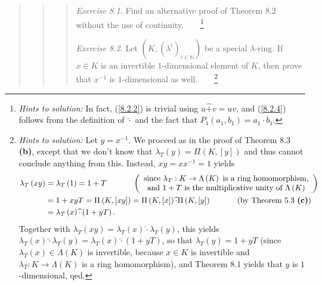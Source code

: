 \documentclass[12pt,final,notitlepage,onecolumn,german]{article}%
\begin{document}
\begin{quote}
\begin{quote}
\begin{quotation}
\textit{Exercise 8.1.} Find an alternative proof of Theorem 8.2 without the
use of continuity.\ \ \ \ \footnote{\textit{Hints to solution:} In fact,
(\ref{8.2.2}) is trivial using $u\widehat{+}v=uv$, and (\ref{8.2.4}) follows
from the definition of $\widehat{\cdot}$ and the fact that $P_{1}\left(
a_{1},b_{1}\right)  =a_{1}\cdot b_{1}$.}

\textit{Exercise 8.2.} Let $\left(  K,\left(  \lambda^{i}\right)
_{i\in\mathbb{N}}\right)  $ be a special $\lambda$-ring. If $x\in K$ is an
invertible $1$-dimensional element of $K$, then prove that $x^{-1}$ is
$1$-dimensional as well.\ \ \ \ \footnote{\textit{Hints to solution:} Let
$y=x^{-1}$. We proceed as in the proof of Theorem 8.3 \textbf{(b)}, except
that we don't know that $\lambda_{T}\left(  y\right)  =\Pi\left(  K,\left[
y\right]  \right)  $ and thus cannot conclude anything from this. Instead,
$xy=xx^{-1}=1$ yields%
\begin{align*}
\lambda_{T}\left(  xy\right)   &  =\lambda_{T}\left(  1\right)
=1+T\ \ \ \ \ \ \ \ \ \ \left(
\begin{array}
[c]{c}%
\text{since }\lambda_{T}:K\rightarrow\Lambda\left(  K\right)  \text{ is a ring
homomorphism,}\\
\text{and }1+T\text{ is the multiplicative unity of }\Lambda\left(  K\right)
\end{array}
\right) \\
&  =1+xyT=\Pi\left(  K,\left[  xy\right]  \right)  =\Pi\left(  K,\left[
x\right]  \right)  \widehat{\cdot}\Pi\left(  K,\left[  y\right]  \right)
\ \ \ \ \ \ \ \ \ \ \left(  \text{by Theorem 5.3 \textbf{(c)}}\right) \\
&  =\lambda_{T}\left(  x\right)  \widehat{\cdot}\left(  1+yT\right)  .
\end{align*}
Together with $\lambda_{T}\left(  xy\right)  =\lambda_{T}\left(  x\right)
\widehat{\cdot}\lambda_{T}\left(  y\right)  $, this yields $\lambda_{T}\left(
x\right)  \widehat{\cdot}\lambda_{T}\left(  y\right)  =\lambda_{T}\left(
x\right)  \widehat{\cdot}\left(  1+yT\right)  $, so that $\lambda_{T}\left(
y\right)  =1+yT$ (since $\lambda_{T}\left(  x\right)  \in\Lambda\left(
K\right)  $ is invertible, because $x\in K$ is invertible and $\lambda
_{T}:K\rightarrow\Lambda\left(  K\right)  $ is a ring homomorphism), and
Theorem 8.1 yields that $y$ is $1$-dimensional, qed.}
\end{quotation}

\begin{center}
\end{center}


\end{quote}
\end{quote}
\end{document}
